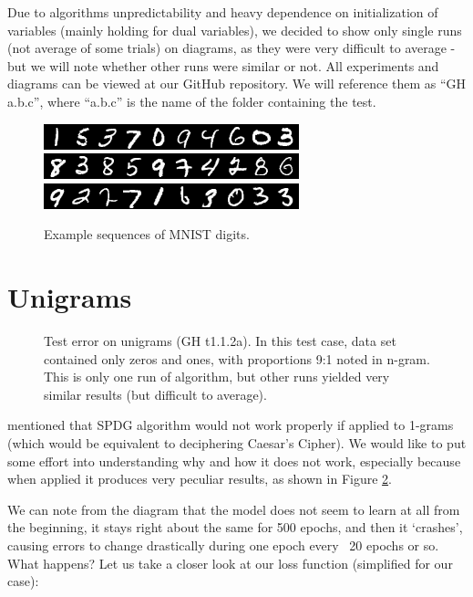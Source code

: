 \documentclass[declaration,shortabstract,lic,english]{iithesis}
\begin{document}
Due to algorithms unpredictability and heavy dependence on initialization of variables (mainly holding for dual variables), we decided to show only single runs (not average of some trials) on diagrams, as they were very difficult to average - but we will note whether other runs were similar or not. All experiments and diagrams can be viewed at our GitHub repository. We will reference them as ``GH a.b.c'', where ``a.b.c'' is the name of the folder containing the test.

\begin{figure}[htb]
    \centering
    \includegraphics{doc/images/img_1537094603.png}
    \includegraphics{doc/images/img_8385974286.png}
    \includegraphics{doc/images/img_9227163033.png}
    \caption{Example sequences of MNIST digits.}
    \label{fig:mnist_sequences_example}
\end{figure}

\section{Unigrams}

\begin{figure}[htb]
    \def\svgwidth{\columnwidth}
    
    \caption{Test error on unigrams (GH t1.1.2a). In this test case, data set contained only zeros and ones, with proportions 9:1 noted in n-gram. This is only one run of algorithm, but other runs yielded very similar results (but difficult to average).}
    \label{fig:t112_error}
\end{figure}


\citet{liu2017unsupervised} mentioned that SPDG algorithm would not work properly if applied to 1-grams (which would be equivalent to deciphering Caesar's Cipher). We would like to put some effort into understanding why and how it does not work, especially because when applied it produces very peculiar results, as shown in Figure \ref{fig:t112_error}.

We can note from the diagram that the model does not seem to learn at all from the beginning, it stays right about the same for 500 epochs, and then it `crashes', causing errors to change drastically during one epoch every ~20 epochs or so. What happens? Let us take a closer look at our loss function (simplified for our case):
\end{document}
